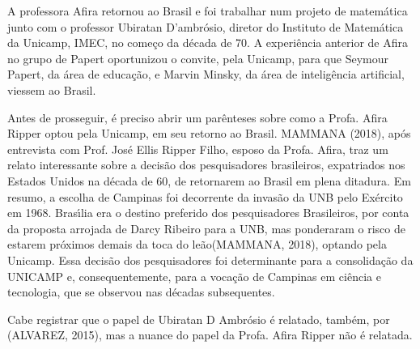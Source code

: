 \documentclass[
12pt,		%
openright,	%
twoside,  %
a4paper,			%
chapter=TITLE,		%
english,			%
french,				%
spanish,			%
brazil				%
]{USPSC-classe/USPSC}
\begin{document}
A professora Afira retornou ao Brasil e foi trabalhar num projeto de matem\'atica junto com o professor Ubiratan D’ambr\'osio, diretor do Instituto de Matem\'atica da Unicamp, IMEC, no come\c{c}o da d\'ecada de 70. A experi\^encia anterior de Afira no grupo de Papert oportunizou o convite, pela Unicamp, para que Seymour Papert, da \'area de educa\c{c}\~ao, e Marvin Minsky, da \'area de intelig\^encia artificial, viessem ao Brasil.

















Antes de prosseguir, \'e preciso abrir um par\^enteses sobre como a Profa. Afira Ripper optou pela Unicamp, em seu retorno ao Brasil.  MAMMANA (2018), ap\'os entrevista com Prof. Jos\'e Ellis Ripper Filho, esposo da Profa. Afira, traz um relato interessante sobre a decis\~ao dos pesquisadores brasileiros, expatriados nos Estados Unidos na d\'ecada de 60, de retornarem ao Brasil em plena ditadura. Em resumo, a escolha de Campinas foi decorrente da invas\~ao da UNB pelo Ex\'ercito em 1968. Bras\'{\i}lia era o destino preferido dos pesquisadores Brasileiros, por conta da proposta arrojada de Darcy Ribeiro para a UNB, mas ponderaram o risco de estarem pr\'oximos demais da \textquotedbl toca do le\~ao\textquotedbl   (MAMMANA, 2018), optando pela Unicamp. Essa decis\~ao dos pesquisadores foi determinante para a consolida\c{c}\~ao da UNICAMP e, consequentemente, para a voca\c{c}\~ao de Campinas em ci\^encia e tecnologia, que se observou nas d\'ecadas subsequentes.

















Cabe registrar que o papel de Ubiratan D Ambr\'osio \'e relatado, tamb\'em, por (ALVAREZ, 2015), mas a nuance do papel da Profa. Afira Ripper n\~ao \'e relatada.
\end{document}
